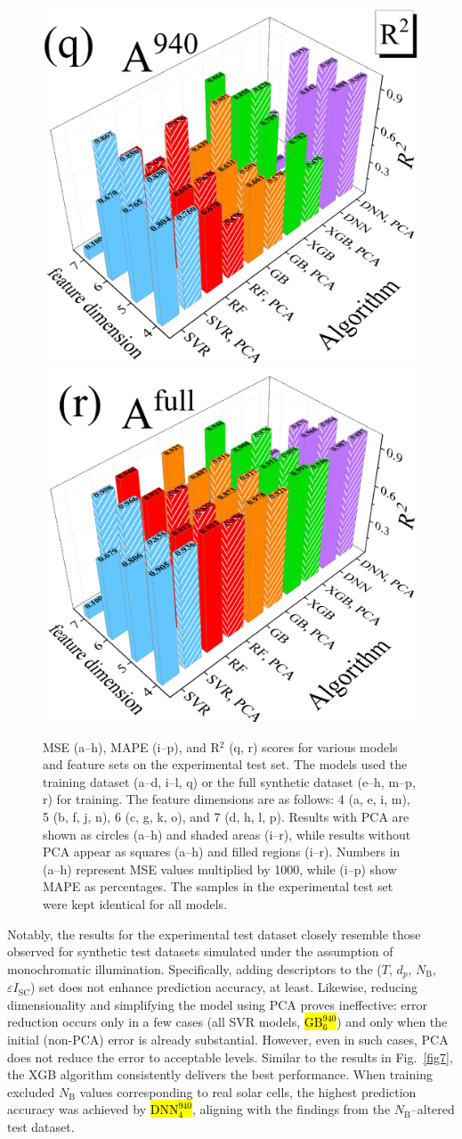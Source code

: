 \documentclass[a4paper,fleqn,draft]{cas-sc}
\begin{document}
\begin{figure}
     \includegraphics[width=0.25\linewidth]{Fig15q.png}
     \includegraphics[width=0.25\linewidth]{Fig15r.png}
	  \caption{MSE (a--h), MAPE (i--p), and R$^{2}$ (q, r) scores for various models and feature sets on the experimental test set.
The models used the training dataset (a--d, i--l, q) or the full synthetic dataset (e--h, m--p, r) for training.
The feature dimensions are as follows: 4 (a, e, i, m), 5 (b, f, j, n), 6 (c, g, k, o), and 7 (d, h, l, p).
Results with PCA are shown as circles (a--h) and shaded areas (i--r),
while results without PCA appear as squares (a--h) and filled regions (i--r).
Numbers in (a--h) represent MSE values multiplied by 1000, while (i--p) show MAPE as percentages.
The samples in the experimental test set were kept identical for all models.
}\label{fig15}
\end{figure}

Notably, the results for the experimental test dataset closely resemble those observed for synthetic test datasets
simulated under the assumption of monochromatic illumination.
Specifically, adding descriptors to the ($T$, $d_p$, $N_\mathrm{B}$, $\varepsilon I_\mathrm{SC}$) set
does not enhance prediction accuracy, at least.
Likewise, reducing dimensionality and simplifying the model using PCA proves ineffective:
error reduction occurs only in a few cases (all SVR models,
\textcolor[rgb]{1.00,0.07,0.00}{
\hl{$\mathrm{GB}^{940}_6$}})
and only when the initial (non-PCA) error is already substantial.
However, even in such cases, PCA does not reduce the error to acceptable levels.
Similar to the results in Fig.~\ref{fig7}, the XGB algorithm consistently delivers the best performance.
When training excluded $N_\mathrm{B}$ values corresponding to real solar cells,
the highest prediction accuracy was achieved by
\textcolor[rgb]{1.00,0.07,0.00}{
\hl{$\mathrm{DNN}^{940}_4$}}, aligning with the findings from the $N_\mathrm{B}$--altered test dataset.
\end{document}
